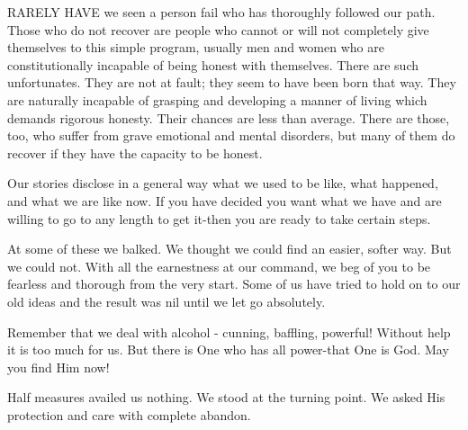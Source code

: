 
\bbChapterPreamble


\begin{biblechapter}
    RARELY HAVE we seen a person fail who has thoroughly followed our path.
Those who do not recover 
    are people who cannot or will not 
    completely give themselves to this simple program, 
    usually men and women 
    who are constitutionally incapable of being honest with themselves.
There are such unfortunates.
They are not at fault; 
    they seem to have been born that way.
They are naturally incapable of grasping and developing 
    a manner of living which demands rigorous honesty.
Their chances are less than average.
There are those, too, 
    who suffer from grave emotional and mental disorders, 
    but many of them do recover if they have the capacity to be honest.

    Our stories disclose in a general way 
    what we used to be like, 
    what happened, 
    and what we are like now.
If you have decided you want what we have 
    and are willing to go to any length to get it-then 
    you are ready to take certain steps.

    At some of these we balked.
We thought we could find an easier, softer way.
But we could not.
With all the earnestness at our command, 
    we beg of you to be fearless and thorough from the very start.
Some of us have tried to hold on to our old ideas 
    and the result was nil until we let go absolutely.

    Remember that we deal with alcohol - cunning, baffling, powerful!
Without help it is too much for us.
But there is One who has all power-that One is God.
May you find Him now!

    Half measures availed us nothing.
We stood at the turning point.
We asked His protection and care with complete abandon.
\end{biblechapter}


